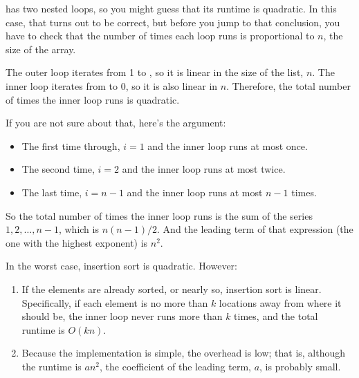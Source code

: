 \documentclass[12pt]{book}
\theoremstyle{exercise}
\begin{document}
 has two nested loops, so you might guess that
its runtime is quadratic. In this case, that turns out to be correct,
but before you jump to that conclusion, you have to check that the
number of times each loop runs is proportional to $n$, the size
of the array.


The outer loop iterates from 1 to , so it is linear
in the size of the list, $n$.
The inner loop iterates from  to 0, so it is also linear in $n$.
Therefore, the total number of times the inner loop runs is quadratic.


If you are not sure about that, here's the argument:

\begin{itemize}

\item
  The first time through, $i=1$ and the inner loop runs at most
  once.

\item
  The second time, $i=2$ and the inner loop runs at most twice.

\item
  The last time, $i=n-1$ and the inner loop runs at most
  $n-1$ times.

\end{itemize}

So the total number of times the inner loop runs is the sum of the
series $1, 2, \ldots , n-1$, which is $n (n-1) / 2$. And the
leading term of that expression (the one with the highest exponent) is
$n^2$.


In the worst case, insertion sort is quadratic. However:

\begin{enumerate}

\item
  If the elements are already sorted, or nearly so, insertion sort is
  linear. Specifically, if each element is no more than $k$
  locations away from where it should be, the inner loop never runs more
  than $k$ times, and the total runtime is $O(kn)$.

\item
  Because the implementation is simple, the overhead is low; that is,
  although the runtime is $a n^2$, the coefficient of the leading
  term, $a$, is probably small.

\end{enumerate}
\end{document}
